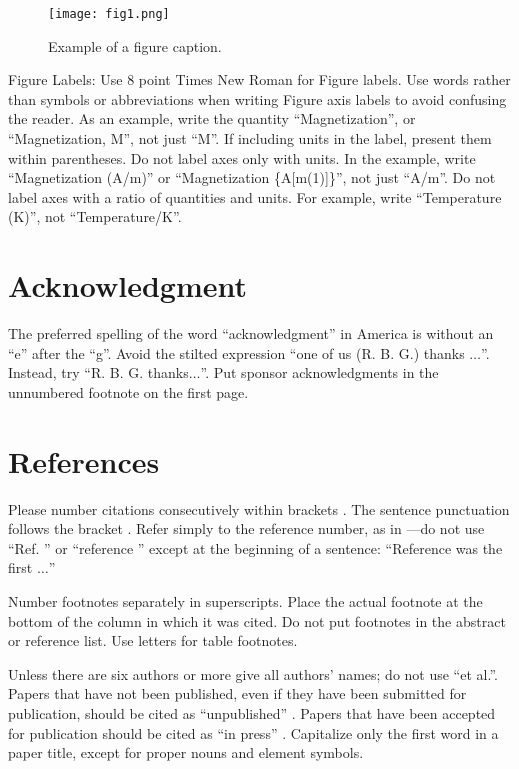 \documentclass[conference]{IEEEtran}
\begin{document}
\begin{figure}[htbp]
\centerline{\texttt{[image: fig1.png]}}
\caption{Example of a figure caption.}
\label{fig}
\end{figure}

Figure Labels: Use 8 point Times New Roman for Figure labels. Use words
rather than symbols or abbreviations when writing Figure axis labels to
avoid confusing the reader. As an example, write the quantity
``Magnetization'', or ``Magnetization, M'', not just ``M''. If including
units in the label, present them within parentheses. Do not label axes only
with units. In the example, write ``Magnetization (A/m)'' or ``Magnetization
\{A[m(1)]\}'', not just ``A/m''. Do not label axes with a ratio of
quantities and units. For example, write ``Temperature (K)'', not
``Temperature/K''.

\section*{Acknowledgment}

The preferred spelling of the word ``acknowledgment'' in America is without
an ``e'' after the ``g''. Avoid the stilted expression ``one of us (R. B.
G.) thanks $\ldots$''. Instead, try ``R. B. G. thanks$\ldots$''. Put sponsor
acknowledgments in the unnumbered footnote on the first page.

\section*{References}

Please number citations consecutively within brackets \cite{b1}. The
sentence punctuation follows the bracket \cite{b2}. Refer simply to the reference
number, as in \cite{b3}---do not use ``Ref. \cite{b3}'' or ``reference \cite{b3}'' except at
the beginning of a sentence: ``Reference \cite{b3} was the first $\ldots$''

Number footnotes separately in superscripts. Place the actual footnote at
the bottom of the column in which it was cited. Do not put footnotes in the
abstract or reference list. Use letters for table footnotes.

Unless there are six authors or more give all authors' names; do not use
``et al.''. Papers that have not been published, even if they have been
submitted for publication, should be cited as ``unpublished'' \cite{b4}. Papers
that have been accepted for publication should be cited as ``in press'' \cite{b5}.
Capitalize only the first word in a paper title, except for proper nouns and
element symbols.
\end{document}
